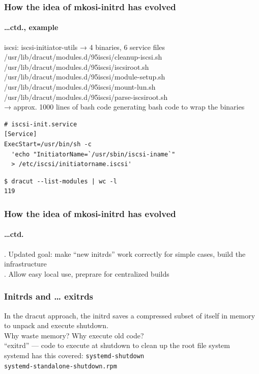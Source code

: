\documentclass[]{beamer}
\newcommand\pp\pause
\begin{document}
\begin{frame}[fragile]
  \frametitle{How the idea of mkosi-initrd has evolved}
  \framesubtitle{…ctd., example}

  \pp
  iscsi:
  iscsi-initiator-utils
  → 4 binaries, 6 service files
  \\

  \pp
  /usr/lib/dracut/modules.d/95iscsi/cleanup-iscsi.sh
  /usr/lib/dracut/modules.d/95iscsi/iscsiroot.sh
  /usr/lib/dracut/modules.d/95iscsi/module-setup.sh
  /usr/lib/dracut/modules.d/95iscsi/mount-lun.sh
  /usr/lib/dracut/modules.d/95iscsi/parse-iscsiroot.sh\\
  → approx. 1000 lines of bash code generating bash code to wrap the binaries
  \pp

  \begin{verbatim}
# iscsi-init.service
[Service]
ExecStart=/usr/bin/sh -c
  'echo "InitiatorName=`/usr/sbin/iscsi-iname`"
  > /etc/iscsi/initiatorname.iscsi'
  \end{verbatim}

  \pp
  \begin{verbatim}
$ dracut --list-modules | wc -l
119
\end{verbatim}
\end{frame}

\begin{frame}
  \frametitle{How the idea of mkosi-initrd has evolved}
  \framesubtitle{…ctd.}

  \pp
  2. Updated goal: make ``new initrds'' work correctly for simple cases, build the infrastructure
  \\

  \pp
  3. Allow easy local use, preprare for centralized builds
\end{frame}

\begin{frame}[fragile]
  \frametitle{Initrds and … exitrds}

  \pp
  In the dracut approach, the initrd saves a compressed subset of itself in memory to unpack and execute shutdown.
  \\

  \pp
  Why waste memory? Why execute old code?
  \\

  \pp
  ``exitrd'' — code to execute at shutdown to clean up the root file system
  \\

  \pp
  systemd has this covered: \texttt{systemd-shutdown}\\
  \texttt{systemd-standalone-shutdown.rpm}
\end{frame}
\end{document}

